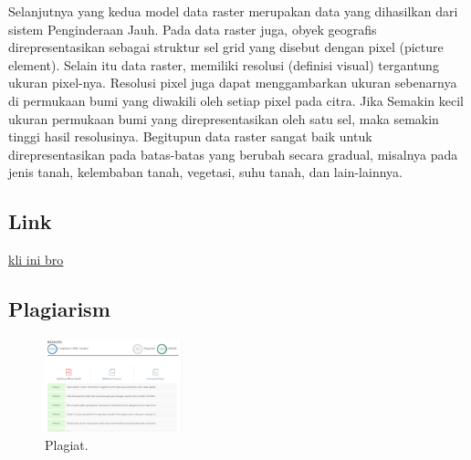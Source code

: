 Selanjutnya yang kedua model data raster merupakan data yang dihasilkan dari sistem Penginderaan Jauh. Pada data raster juga, obyek geografis direpresentasikan sebagai struktur sel grid yang disebut dengan pixel (picture element).  Selain itu  data raster, memiliki  resolusi (definisi visual) tergantung ukuran pixel-nya.  Resolusi  pixel juga dapat  menggambarkan ukuran sebenarnya di permukaan bumi yang diwakili oleh setiap pixel pada citra. Jika Semakin kecil ukuran permukaan bumi yang direpresentasikan oleh satu sel, maka semakin tinggi  hasil resolusinya. Begitupun data raster sangat baik untuk direpresentasikan pada batas-batas yang berubah secara gradual, misalnya pada  jenis tanah, kelembaban tanah, vegetasi, suhu tanah, dan lain-lainnya.


\subsection{Link}
\href{https://youtu.be/hFj3s-4dte8}{kli ini bro}
\subsection{Plagiarism}
\begin{figure}[H]
	\includegraphics[width=4cm]{figures/1174039/plagiat.png}
	\centering
	\caption{Plagiat.}
\end{figure}

